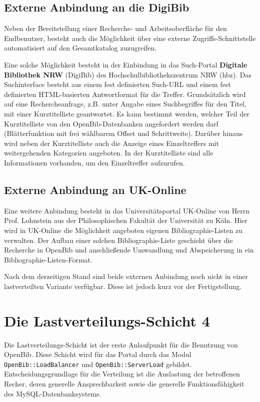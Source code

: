 \documentclass[11pt, twoside, a4paper, BCOR8mm, DIV12, bibtotoc,idxtotoc]{scrbook}
\begin{document}
\subsection{Externe Anbindung an die DigiBib}

Neben der Bereitstellung einer Recherche- und Arbeitsoberfläche für
den Endbenutzer, besteht auch die Möglichkeit über eine externe
Zugriffs-Schnittstelle automatisiert auf den Gesamtkatalog
zuzugreifen.

Eine solche Möglichkeit besteht in der Einbindung in das Such-Portal
\textbf{Digitale Bibliothek NRW} (DigiBib) des
Hoch\-schul\-bibliotheks\-zentrum NRW (hbz). Das Suchinterface besteht aus
einem fest definierten Such-URL und einem fest definierten
HTML-basierten Antwortformat für die Treffer. Grundsätzlich wird auf
eine Rechercheanfrage, z.B. unter Angabe eines Suchbegriffes für den
Titel, mit einer Kurztitelliste geantwortet. Es kann bestimmt werden,
welcher Teil der Kurztitelliste von den OpenBib-Daten\-banken
angefordert werden darf (Blätterfunktion mit frei wählbarem Offset
und Schrittweite). Darüber hinaus wird neben der Kurztitelliste auch
die Anzeige eines Einzeltreffers mit weiter\-gehen\-den Kategorien
angeboten. In der Kurztitelliste sind alle Informationen vorhanden, um
den Einzeltreffer aufzurufen.

\subsection{Externe Anbindung an UK-Online}

Eine weitere Anbindung besteht in das Universitätsportal UK-Online
von Herrn Prof. Lohnstein aus der Philosophischen Fakultät der
Universität zu Köln. Hier wird in UK-Online die Möglichkeit
angeboten eigenen Bibliographie-Listen zu verwalten. Der Aufbau einer
solchen Bibliographie-Liste geschieht über die Recherche in OpenBib
und anschließende Umwandlung und Ab\-spei\-cherung in ein
Bibliographie-Listen-Format.

Nach dem derzeitigen Stand sind beide externen Anbindung noch nicht in
einer lastverteilten Variante verfügbar. Diese ist jedoch kurz vor
der Fertigstellung.

\section{Die Lastverteilungs-Schicht 4}

Die Lastverteilungs-Schicht ist der erste Anlaufpunkt für die
Benutzung von OpenBib. Diese Schicht wird für das Portal durch das
Modul \texttt{OpenBib::LoadBalancer} und \texttt{OpenBib::ServerLoad} gebildet.
Entscheidungsgrundlage für die Verteilung ist die Auslastung der
betroffenen Recher, deren generelle Ansprechbarkeit sowie die
generelle Funktionsfähigkeit des MySQL-Daten\-bank\-sys\-tems.
\end{document}
